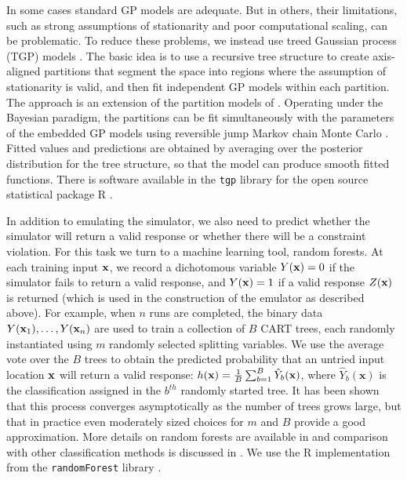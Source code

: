 \documentclass[12pt]{article}
\begin{document}
In some cases standard GP models are adequate.  But in others, their
limitations, such as strong assumptions of stationarity and poor
computational scaling, can be problematic.  To reduce these problems,
we instead use treed Gaussian process (TGP) models
\cite{gra:lee:2008}.  The basic idea is to use a recursive tree
structure to create axis-aligned partitions that segment the space
into regions where the assumption of stationarity is valid, and then
fit independent GP models within each partition.  The approach is an
extension of the partition models of \cite{chip:geor:mccu:2002}.
Operating under the Bayesian paradigm, the partitions can be fit
simultaneously with the parameters of the embedded GP models using
reversible jump Markov chain Monte Carlo \cite{gree:1995}.  Fitted
values and predictions are obtained by averaging over the posterior
distribution for the tree structure, so that the model can produce
smooth fitted functions.  There is software available in the {\tt tgp}
library \cite{Gramacy:2007} for the open source statistical package
{\sf R} \cite{R.base}.

In addition to emulating the simulator, we also need to predict
whether the simulator will return a valid response or whether there
will be a constraint violation.  For this task we turn to a machine
learning tool, random forests. At each training input ${\bf x}$, we
record a dichotomous variable $Y({\bf x})=0$ if the simulator fails to
return a valid response, and $Y({\bf x})=1$ if a valid response $Z({\bf
  x})$ is returned (which is used in the construction of the emulator
as described above).  For example, when $n$ runs are completed, the
binary data $Y({\bf x}_1),\ldots,Y({\bf x}_n)$ are used to train a
collection of $B$ CART trees, each randomly instantiated
\cite{brei:1984} using $m$ randomly selected splitting variables.  We
use the average vote over the $B$ trees to obtain the predicted
probability that an untried input location $\bf{x}$ will return a
valid response: $h({\bf x}) =
\frac{1}{B}\sum_{b=1}^B\hat{Y}_b(\mathbf{x})$, where
$\hat{Y}_b(\mathbf{x})$ is the classification assigned in the $b^{th}$
randomly started tree.  It has been shown that this process converges
asymptotically as the number of trees grows large, but that in
practice even moderately sized choices for $m$ and $B$ provide a good
approximation.  More details on random forests are available in
\cite{brei:2001} and comparison with other classification methods is
discussed in \cite{hastie:tibshirani:friedman:2001}.  We use the {\sf R}
implementation from the {\tt randomForest} library
\cite{liaw:wien:2002}.
\end{document}
